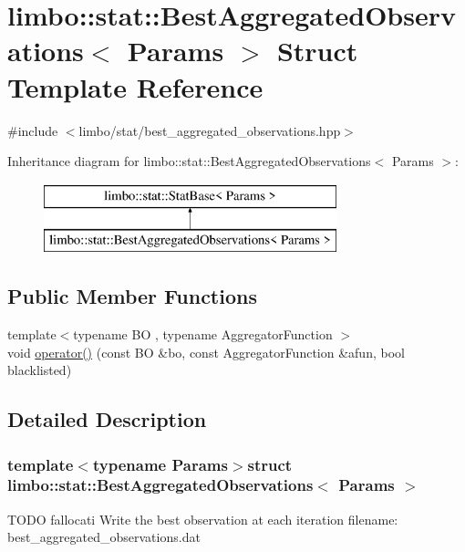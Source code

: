\hypertarget{structlimbo_1_1stat_1_1_best_aggregated_observations}{}\section{limbo\+:\+:stat\+:\+:Best\+Aggregated\+Observations$<$ Params $>$ Struct Template Reference}
\label{structlimbo_1_1stat_1_1_best_aggregated_observations}


{\ttfamily \#include $<$limbo/stat/best\+\_\+aggregated\+\_\+observations.\+hpp$>$}

Inheritance diagram for limbo\+:\+:stat\+:\+:Best\+Aggregated\+Observations$<$ Params $>$\+:\begin{figure}[H]
\begin{center}
\leavevmode
\includegraphics[height=2.000000cm]{structlimbo_1_1stat_1_1_best_aggregated_observations}
\end{center}
\end{figure}
\subsection*{Public Member Functions}
\begin{DoxyCompactItemize}
\item 
{\footnotesize template$<$typename B\+O , typename Aggregator\+Function $>$ }\\void \hyperlink{structlimbo_1_1stat_1_1_best_aggregated_observations_a1f2d6f8781b48e2840a2c6c69c99ef61}{operator()} (const B\+O \&bo, const Aggregator\+Function \&afun, bool blacklisted)
\end{DoxyCompactItemize}


\subsection{Detailed Description}
\subsubsection*{template$<$typename Params$>$struct limbo\+::stat\+::\+Best\+Aggregated\+Observations$<$ Params $>$}

T\+O\+D\+O fallocati Write the best observation at each iteration filename\+: {\ttfamily best\+\_\+aggregated\+\_\+observations.\+dat} 

